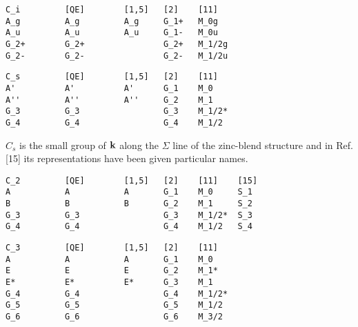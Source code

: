 \documentclass[12pt,a4paper,twoside]{report}
\begin{document}
\begin{tcolorbox}
\begin{footnotesize}
\begin{verbatim}
C_i         [QE]        [1,5]   [2]    [11] 
A_g         A_g         A_g     G_1+   M_0g
A_u         A_u         A_u     G_1-   M_0u
G_2+        G_2+                G_2+   M_1/2g
G_2-        G_2-                G_2-   M_1/2u
\end{verbatim}
\end{footnotesize}
\end{tcolorbox}


\begin{tcolorbox}
\begin{footnotesize}
\begin{verbatim}
C_s         [QE]        [1,5]   [2]    [11] 
A'          A'          A'      G_1    M_0
A''         A''         A''     G_2    M_1
G_3         G_3                 G_3    M_1/2*
G_4         G_4                 G_4    M_1/2
\end{verbatim}
\end{footnotesize}
\end{tcolorbox}

$C_s$ is the small group of ${\bf k}$ along the $\Sigma$ line of the 
zinc-blend structure and in Ref.[15] its representations have been given
particular names.

\begin{tcolorbox}
\begin{footnotesize}
\begin{verbatim}
C_2         [QE]        [1,5]   [2]    [11]    [15]  
A           A           A       G_1    M_0     S_1
B           B           B       G_2    M_1     S_2
G_3         G_3                 G_3    M_1/2*  S_3
G_4         G_4                 G_4    M_1/2   S_4
\end{verbatim}
\end{footnotesize}
\end{tcolorbox}

\begin{tcolorbox}
\begin{footnotesize}
\begin{verbatim}
C_3         [QE]        [1,5]   [2]    [11]
A           A           A       G_1    M_0
E           E           E       G_2    M_1*
E*          E*          E*      G_3    M_1
G_4         G_4                 G_4    M_1/2*
G_5         G_5                 G_5    M_1/2
G_6         G_6                 G_6    M_3/2
\end{verbatim}
\end{footnotesize}
\end{tcolorbox}
\end{document}
